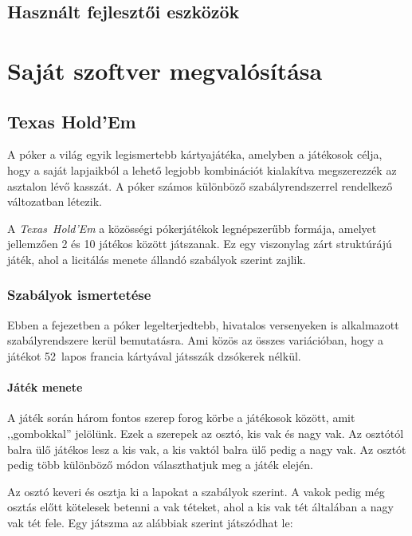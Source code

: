 \documentclass[]{thesis-ekf}
\theoremstyle{definition}
\theoremstyle{remark}
\begin{document}
\section{Használt fejlesztői eszközök}

\chapter{Saját szoftver megvalósítása}

\section{Texas Hold'Em}

A póker a világ egyik legismertebb kártyajátéka, amelyben a játékosok célja, hogy a saját lapjaikból a lehető legjobb kombinációt kialakítva megszerezzék az asztalon lévő kasszát. A póker számos különböző szabályrendszerrel rendelkező változatban létezik.

A \emph{Texas~Hold’Em} a közösségi pókerjátékok legnépszerűbb formája, amelyet jellemzően 2 és 10 játékos között játszanak. Ez egy viszonylag zárt struktúrájú játék, ahol a licitálás menete állandó szabályok szerint zajlik.

\subsection{Szabályok ismertetése}

Ebben a fejezetben a póker legelterjedtebb, hivatalos versenyeken is alkalmazott szabályrendszere kerül bemutatásra. Ami közös az összes variációban, hogy a játékot 52~lapos francia kártyával játsszák dzsókerek nélkül.

\subsubsection{Játék menete}

A játék során három fontos szerep forog körbe a játékosok között, amit ,,gombokkal'' jelölünk. Ezek a szerepek az osztó, kis vak és nagy vak. Az osztótól balra ülő játékos lesz a kis vak, a kis vaktól balra ülő pedig a nagy vak. Az osztót pedig több különböző módon választhatjuk meg a játék elején.  

Az osztó keveri és osztja ki a lapokat a szabályok szerint. A vakok pedig még osztás előtt kötelesek betenni a vak téteket, ahol a kis vak tét általában a nagy vak tét fele. Egy játszma az alábbiak szerint játszódhat le: \cite{WikipediaTexasholdem}
\end{document}
